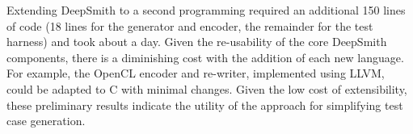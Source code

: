 Extending DeepSmith to a second programming required an additional 150 lines of code (18 lines for the generator and encoder, the remainder for the test harness) and took about a day. Given the re-usability of the core DeepSmith components, there is a diminishing cost with the addition of each new language. For example, the OpenCL encoder and re-writer, implemented using LLVM, could be adapted to C with minimal changes. Given the low cost of extensibility, these preliminary results indicate the utility of the approach for simplifying test case generation.
